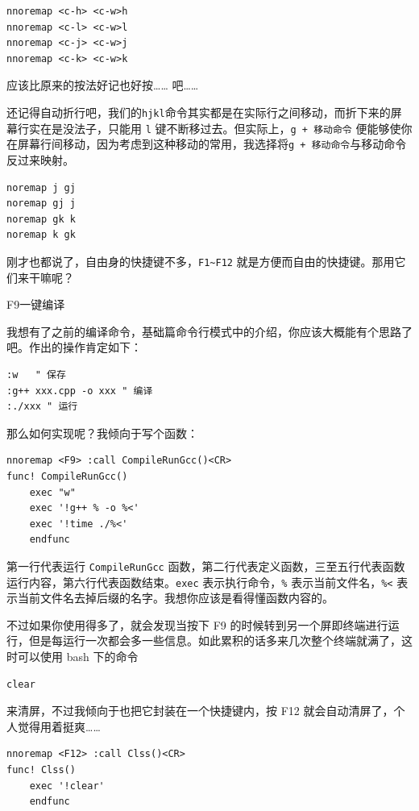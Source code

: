 \begin{verbatim}
nnoremap <c-h> <c-w>h  
nnoremap <c-l> <c-w>l  
nnoremap <c-j> <c-w>j  
nnoremap <c-k> <c-w>k
\end{verbatim}

应该比原来的按法好记也好按…… 吧……

还记得自动折行吧，我们的\texttt{hjkl}命令其实都是在实际行之间移动，而折下来的屏幕行实在是没法子，只能用 \texttt{l} 键不断移过去。但实际上，\texttt{g + 移动命令} 便能够使你在屏幕行间移动，因为考虑到这种移动的常用，我选择将\texttt{g + 移动命令}与移动命令反过来映射。

\begin{verbatim}
noremap j gj
noremap gj j
noremap gk k
noremap k gk
\end{verbatim}

刚才也都说了，自由身的快捷键不多，\texttt{F1\textasciitilde{}F12} 就是方便而自由的快捷键。那用它们来干嘛呢？

F9一键编译

我想有了之前的编译命令，基础篇命令行模式中的介绍，你应该大概能有个思路了吧。作出的操作肯定如下：

\begin{verbatim}
:w   " 保存
:g++ xxx.cpp -o xxx " 编译
:./xxx " 运行
\end{verbatim}

那么如何实现呢？我倾向于写个函数：

\begin{verbatim}
nnoremap <F9> :call CompileRunGcc()<CR>
func! CompileRunGcc()
    exec "w" 
    exec '!g++ % -o %<'
    exec '!time ./%<'
    endfunc  
\end{verbatim}

第一行代表运行 \texttt{CompileRunGcc} 函数，第二行代表定义函数，三至五行代表函数运行内容，第六行代表函数结束。\texttt{exec} 表示执行命令，\texttt{\%} 表示当前文件名，\texttt{\%<} 表示当前文件名去掉后缀的名字。我想你应该是看得懂函数内容的。

不过如果你使用得多了，就会发现当按下 F9 的时候转到另一个屏即终端进行运行，但是每运行一次都会多一些信息。如此累积的话多来几次整个终端就满了，这时可以使用 bash 下的命令

\begin{verbatim}
clear
\end{verbatim}

来清屏，不过我倾向于也把它封装在一个快捷键内，按 F12 就会自动清屏了，个人觉得用着挺爽……

\begin{verbatim}
nnoremap <F12> :call Clss()<CR>
func! Clss()
    exec '!clear'
    endfunc
\end{verbatim}


